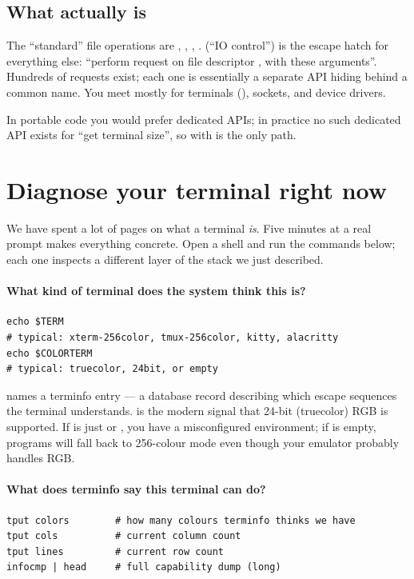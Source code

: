 \subsection{What  actually is}

The ``standard'' file operations are , ,
, .  (``IO control'') is the
escape hatch for everything else: ``perform request  on file
descriptor , with these arguments''. Hundreds of requests
exist; each one is essentially a separate API hiding behind a
common name. You meet  mostly for terminals
(), sockets, and device drivers.

In portable code you would prefer dedicated APIs; in practice no
such dedicated API exists for ``get terminal size'', so 
with  is the only path.

\section{Diagnose your terminal right now}
\label{sec:term:diagnose}

We have spent a lot of pages on what a terminal \emph{is}. Five
minutes at a real prompt makes everything concrete. Open a shell
and run the commands below; each one inspects a different layer of
the stack we just described.

\paragraph{What kind of terminal does the system think this is?}
\begin{lstlisting}[style=shell]
echo $TERM
# typical: xterm-256color, tmux-256color, kitty, alacritty
echo $COLORTERM
# typical: truecolor, 24bit, or empty
\end{lstlisting}

 names a terminfo entry --- a database record describing
which escape sequences the terminal understands. 
is the modern signal that 24-bit (truecolor) RGB is supported. If
 is just  or , you have a
misconfigured environment; if  is empty, programs
will fall back to 256-colour mode even though your emulator probably
handles RGB.

\paragraph{What does terminfo say this terminal can do?}
\begin{lstlisting}[style=shell]
tput colors        # how many colours terminfo thinks we have
tput cols          # current column count
tput lines         # current row count
infocmp | head     # full capability dump (long)
\end{lstlisting}

